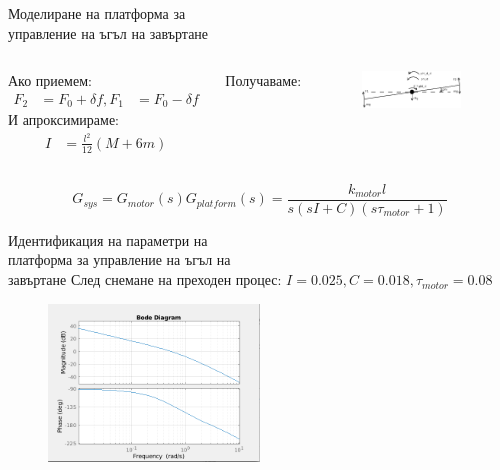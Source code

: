 \documentclass[handout]{beamer}
\begin{document}
\begin{frame}{Моделиране на платформа за\\управление на ъгъл на завъртане}
	\begin{columns}

		Ако приемем:
		\begin{align*}
			F_2 &= F_0 + \delta f,F_1 &= F_0 - \delta f 
		\end{align*}
		И апроксимираме:
		\begin{align*}
			I &= \frac{l^2}{12}(M + 6m)
		\end{align*}

		Получаваме:\\[1em]

		
		\begin{figure}[htpb!]
			\centering
			\includegraphics[width=0.9\textwidth]{Images/balance_force_diagram.png}
		\end{figure}

	\end{columns}

	\begin{equation*}
	G_{sys} = G_{motor}(s)G_{platform}(s) = 
	\frac{k_{motor} l}{s( s I + C)(s \tau_{motor} + 1)} 
	\end{equation*}

\end{frame}

\begin{frame}{Идентификация на параметри на \\ платформа за управление на ъгъл на \\завъртане}
	След снемане на преходен процес:
	\(I = 0.025, C = 0.018, \tau_{motor} = 0.08\)
			
	\begin{figure}[htpb!]
		\centering
		\includegraphics[width=0.5\textwidth]{Images/bode_balance.png}
	\end{figure}
\end{frame}
\end{document}
